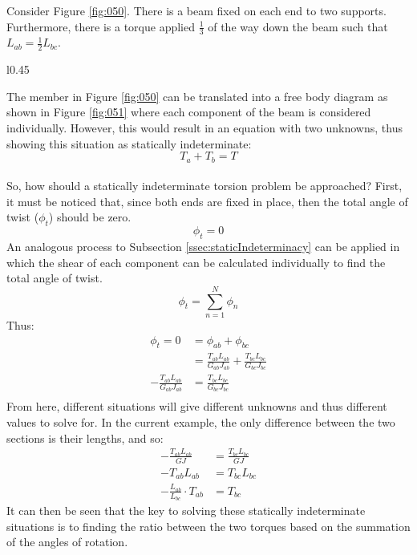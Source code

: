 \documentclass[12pt]{article}
\begin{document}
Consider Figure \ref{fig:050}. There is a beam fixed on each end to two supports. Furthermore, there is a torque applied $\frac{1}{3}$ of the way down the beam such that $L_{ab} = \frac{1}{2}L_{bc}$.

\begin{wrapfigure}[7]{l}{0.45\textwidth}
  \centering
  
  \caption{Free Body Diagram}
  \label{fig:051}
\end{wrapfigure}

The member in Figure \ref{fig:050} can be translated into a free body diagram as shown in Figure \ref{fig:051} where each component of the beam is considered individually. However, this would result in an equation with two unknowns, thus showing this situation as statically indeterminate:
\begin{equation*}
  T_a + T_b = T
\end{equation*} \\
So, how should a statically indeterminate torsion problem be approached? First, it must be noticed that, since both ends are fixed in place, then the total angle of twist ($\phi_{t}$) should be zero.
\begin{equation*}
  \phi_{t} = 0
\end{equation*}
An analogous process to Subsection \ref{ssec:staticIndeterminacy} can be applied in which the shear of each component can be calculated individually to find the total angle of twist.
\begin{equation*}
  \phi_{t} = \sum_{n=1}^{N} \phi_{n}
\end{equation*}
Thus:
\begin{align*}
  \phi_{t} = 0                       &= \phi_{ab} + \phi_{bc} \\
                                     &= \frac{T_{ab}L_{ab}}{G_{ab}J_{ab}} + \frac{T_{bc}L_{bc}}{G_{bc}J_{bc}} \\ 
  -\frac{T_{ab}L_{ab}}{G_{ab}J_{ab}} &= \frac{T_{bc}L_{bc}}{G_{bc}J_{bc}} \\
\end{align*}
From here, different situations will give different unknowns and thus different values to solve for. In the current example, the only difference between the two sections is their lengths, and so:
\begin{align*}
  -\frac{T_{ab}L_{ab}}{GJ} &= \frac{T_{bc}L_{bc}}{GJ} \\
  -T_{ab}L_{ab} &= T_{bc}L_{bc} \\
  -\frac{L_{ab}}{L_{bc}} \cdot T_{ab} &= T_{bc}
\end{align*}
It can then be seen that the key to solving these statically indeterminate situations is to finding the ratio between the two torques based on the summation of the angles of rotation.
\end{document}
